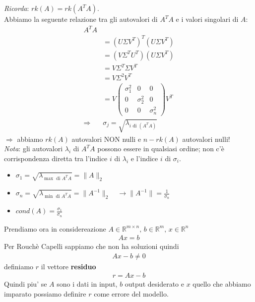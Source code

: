 \documentclass[a4paper,12pt]{article}
\begin{document}
\textit{Ricorda}: $rk(A)=rk(A^TA)$.\\
Abbiamo la seguente relazione tra gli autovalori di $A^TA$ e i valori singolari di $A$:
\[
\begin{aligned}
A^T A & \\
&= (U \Sigma V^T)^T (U \Sigma V^T) \\
&= (V \Sigma^T U^T)(U \Sigma V^T) \\
&= V \Sigma^T \Sigma V^T \\
&= V \Sigma^2 V^T \\
&= V \begin{pmatrix}
        \sigma_1^2 & 0 & 0 \\
        0 & \sigma_2^2 & 0 \\
        0 & 0 & \sigma_n^2
    \end{pmatrix} V^T \\
\Rightarrow\ &\boxed{\sigma_j = \sqrt{\lambda_{i \text{ di } (A^T A)}}}
\end{aligned}
\]
$\Rightarrow$ abbiamo $rk(A)$ autovalori NON nulli e $n-rk(A)$ autovalori nulli!\\
\textit{Nota}: gli autovalori $\lambda_i$ di $A^TA$ possono essere in qualsiasi ordine; non c'è corrispondenza diretta tra l'indice $i$ di $\lambda_i$ e l'indice $i$ di $\sigma_i$.
\begin{itemize}
    \item $\sigma_1 = \sqrt{\lambda_{\max \text{ di } A^T A}} = \| A \|_2$ 
    \item $\sigma_n = \sqrt{\lambda_{\min \text{ di } A^T A}}=\| A^{-1} \|_2 \quad \rightarrow \| A^{-1} \| = \frac{1}{\sigma_n}$
    \item \hyperref[sec:cond]{$cond(A) = \frac{\sigma_1}{\sigma_n}$}
\end{itemize}
\vspace{2em}
Prendiamo ora in considereazione $A \in \mathbb{R}^{m \times n}, \, b \in \mathbb{R}^m, \, x \in \mathbb{R}^n$ 
\begin{align*}
    Ax = b
\end{align*}
Per Rouchè Capelli sappiamo che non ha soluzioni quindi
\begin{align*}
    Ax-b \neq 0
\end{align*}
definiamo $r$ il vettore \textbf{residuo}
\begin{align*}
    r = Ax-b
\end{align*}
Quindi piu' se $A$ sono i dati in input, $b$ output desiderato e $x$ quello che abbiamo imparato possiamo definire $r$ come errore del modello. \\
\end{document}
